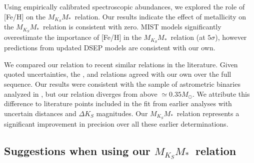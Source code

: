 \documentclass[twocolumn]{aastex62}
\newcommand{\mmk}{$M_{K_S}$\textendash$M_*$}
\begin{document}
Using empirically calibrated spectroscopic abundances, we explored the role of [Fe/H] on the \mmk\ relation. Our results indicate the effect of metallicity on the \mmk\ relation is consistent with zero. MIST models significantly overestimate the importance of [Fe/H] in the \mmk\ relation (at $5\sigma$), however predictions from updated DSEP models are consistent with our own. 

We compared our relation to recent similar relations in the literature. Given quoted uncertainties, the \citet{Hen1993}, \citet{Delfosse2000} and \citet{Mann2015b} relations agreed with our own over the full sequence. Our results were consistent with the sample of astrometric binaries analyzed in \citet{Benedict2016}, but our relation diverges from \citet{Benedict2016} above $\simeq0.35M_\odot$. We attribute this difference to literature points included in the \citet{Benedict2016} fit from earlier analyses with uncertain distances and $\Delta K_S$ magnitudes. Our \mmk\ relation represents a significant improvement in precision over all these earlier determinations. 

\subsection{Suggestions when using our \mmk\ relation}\label{sec:caveats}
\end{document}
